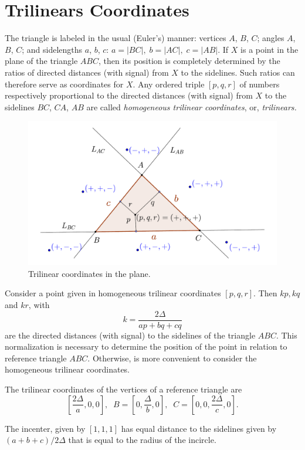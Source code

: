 
\section{Trilinears Coordinates}
\label{app:Atrilins}

The triangle is labeled in the usual (Euler's) manner: vertices $A$, $B$, $C$; angles $A$, $B$, $C$;
and sidelengths $a$, $b$, $c$: $a=|BC|,\; b =|AC|,\; c =|AB|$. If $X$ is a point in the plane of
the triangle $ABC$, then its position is completely determined by the ratios of directed distances (with signal)
from $X$ to the sidelines. Such ratios can therefore serve as coordinates for $X$.
Any ordered triple $[p, q,r]$ of numbers respectively proportional to the
directed distances (with signal) from $X$ to the sidelines $BC$, $CA$, $AB$ are called {\em  homogeneous trilinear coordinates}, or,  {\em  trilinears.}

\begin{figure}
    \centering
 \includegraphics[scale=0.5]{zappA/pics/pics-appA-020-trilinear_signal.pdf}
    \caption{Trilinear coordinates in the plane.}
    \label{fig:trilinear_signal}
\end{figure}

Consider a point given in  homogeneous trilinear coordinates $[p,q,r]$.   Then   $k p,k q$ and $k r$, with
%
\[
k=\frac{2\Delta}{a p+b q+c q}
\]
are the directed distances (with signal) to the sidelines of the triangle $ABC$. This normalization is necessary  to      determine the position of the point in relation to reference triangle $ABC$. Otherwise, is more convenient to consider the homogeneous trilinear coordinates.

The trilinear coordinates of the vertices of a reference triangle are
\[ [\frac{2\Delta}{a},0,0],\;\;B=[ 
0,\frac{
	\Delta}{b} ,0],\;\; C=[
0,0,\frac{2\Delta}{c},0].
\]

The incenter, given by $[1,1,1]$ has equal distance to the sidelines given by $(a+b+c)/2\Delta$ that is equal to the radius of the incircle.